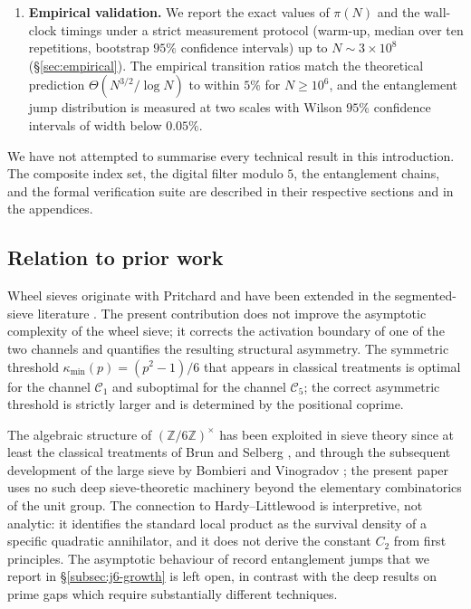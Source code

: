 \documentclass[11pt]{amsart}
\numberwithin{equation}{section}
\newcommand{\ZZ}{\mathbb{Z}}
\newcommand{\kmin}{\kappa_{\min}}
\newcommand{\Cone}{\mathcal{C}_1}
\newcommand{\Cfive}{\mathcal{C}_5}
\theoremstyle{plain}
\theoremstyle{definition}
\begin{document}
\begin{enumerate}
\item \textbf{Empirical validation.} We report the exact values of
  $\pi(N)$ and the wall-clock timings under a strict measurement
  protocol (warm-up, median over ten repetitions, bootstrap $95\%$
  confidence intervals) up to $N\sim 3\times 10^8$
  (§\ref{sec:empirical}). The empirical transition ratios match the
  theoretical prediction $\Theta(N^{3/2}/\log N)$ to within $5\%$
  for $N\ge 10^6$, and the entanglement jump distribution is measured
  at two scales with Wilson $95\%$ confidence intervals of width
  below $0.05\%$.

\end{enumerate}

We have not attempted to summarise every technical result in this
introduction. The composite index set, the digital filter modulo $5$,
the entanglement chains, and the formal verification suite are
described in their respective sections and in the appendices.

\subsection{Relation to prior work}

Wheel sieves originate with Pritchard \cite{Pritchard1981,Pritchard1982}
and have been extended in the segmented-sieve literature
\cite{Sorenson1998,Galway2004,OliveiraeSilva2006}. The present
contribution does not improve the asymptotic complexity of the wheel
sieve; it corrects the activation boundary of one of the two channels
and quantifies the resulting structural asymmetry. The symmetric
threshold $\kmin(p)=(p^2-1)/6$ that appears in classical treatments is
optimal for the channel $\Cone$ and suboptimal for the channel
$\Cfive$; the correct asymmetric threshold is strictly larger and is
determined by the positional coprime.

The algebraic structure of $(\ZZ/6\ZZ)^\times$ has been exploited in
sieve theory since at least the classical treatments of Brun
\cite{Brun1919} and Selberg \cite{Selberg1947}, and through the
subsequent development of the large sieve by Bombieri
\cite{Bombieri1965} and Vinogradov \cite{Vinogradov1965}; the present
paper uses no such deep sieve-theoretic machinery beyond the elementary
combinatorics of the unit group. The connection to Hardy--Littlewood
\cite{HardyLittlewood1923} is interpretive, not analytic: it identifies
the standard local product as the survival density of a specific
quadratic annihilator, and it does not derive the constant $C_2$ from
first principles. The asymptotic behaviour of record entanglement
jumps that we report in \S\ref{subsec:j6-growth} is left open, in
contrast with the deep results on prime gaps
\cite{Maynard2015,FKPT2016} which require substantially different
techniques.
\end{document}
